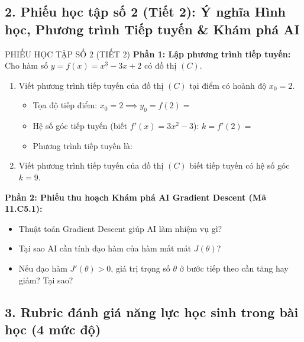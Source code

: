 \documentclass[12pt, a4paper]{article}
\begin{document}
\subsection*{2. Phiếu học tập số 2 (Tiết 2): Ý nghĩa Hình học, Phương trình Tiếp tuyến & Khám phá AI}

\begin{pedabox}{PHIẾU HỌC TẬP SỐ 2 (TIẾT 2)}
\textbf{Phần 1: Lập phương trình tiếp tuyến:}
Cho hàm số $y = f(x) = x^3 - 3x + 2$ có đồ thị $(C)$.
\begin{enumerate}[leftmargin=0.6cm]
    \item Viết phương trình tiếp tuyến của đồ thị $(C)$ tại điểm có hoành độ $x_0 = 2$.
    \begin{itemize}
        \item Tọa độ tiếp điểm: $x_0 = 2 \implies y_0 = f(2) = $ \dotfill
        \item Hệ số góc tiếp tuyến (biết $f'(x) = 3x^2 - 3$): $k = f'(2) = $ \dotfill
        \item Phương trình tiếp tuyến là: \dotfill
    \end{itemize}
    \item Viết phương trình tiếp tuyến của đồ thị $(C)$ biết tiếp tuyến có hệ số góc $k = 9$.
\end{enumerate}

\textbf{Phần 2: Phiếu thu hoạch Khám phá AI Gradient Descent (Mã 11.C5.1):}
\begin{itemize}[leftmargin=0.5cm]
    \item Thuật toán Gradient Descent giúp AI làm nhiệm vụ gì? \dotfill
    \item Tại sao AI cần tính đạo hàm của hàm mất mát $J(\theta)$? \dotfill
    \item Nếu đạo hàm $J'(\theta) > 0$, giá trị trọng số $\theta$ ở bước tiếp theo cần tăng hay giảm? Tại sao? \dotfill
\end{itemize}
\end{pedabox}

\subsection*{3. Rubric đánh giá năng lực học sinh trong bài học (4 mức độ)}
\end{document}
